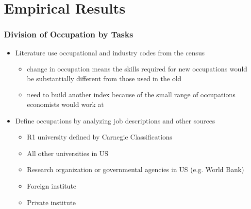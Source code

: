 \documentclass[10pt,svgnames,fragile]{beamer}
\begin{document}
{
	\AtBeginSection{}
	\section{Empirical Results}
	\begin{frame}
		\frametitle{Division of Occupation by Tasks}
		\begin{itemize}
			\item Literature use occupational and industry codes from the census
			\begin{itemize}
				\vspace{1.5 mm}
				\item change in occupation means the skills required for new occupations would be substantially different from those used in the old 
				\vspace{1.5 mm}
				\item need to build another index because of the small range of occupations economists would work at
			\end{itemize}
			\vfill
			\item Define occupations  by analyzing job descriptions and other sources
			\begin{itemize}
				\vspace{1.5 mm}
				\item R1 university defined by {\small Carnegie Classifications}
				\vspace{1.5 mm}
				\item All other universities in US
				\vspace{1.5 mm}
				\item Research organization or governmental agencies in US (e.g. World Bank)
				\vspace{1.5 mm}
				\item Foreign institute
				\vspace{1.5 mm}
				\item Private institute\\
				\vspace{1.5 mm}
			
			\end{itemize}
			\vfill
		\end{itemize}
	\end{frame}
	
}
\end{document}
